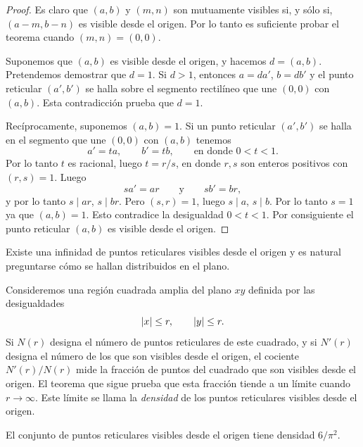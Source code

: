 \documentclass[12pt,a4paper]{book}
\begin{document}
    \begin{proof}
        Es claro que $(a,b)$ y $(m,n)$ son mutuamente visibles si, y sólo si,
        $(a-m,b-n)$ es visible desde el origen. Por lo tanto es suficiente probar el
        teorema cuando $(m,n)=(0,0)$.

        Suponemos que $(a,b)$ es visible desde el origen, y hacemos $d=(a,b)$. Pretendemos
        demostrar que $d=1$. Si $d>1$, entonces $a=da'$, $b=db'$ y el punto reticular
        $(a',b')$ se halla sobre el segmento rectilíneo que une $(0,0)$ con $(a,b)$. Esta
        contradicción prueba que $d=1$.

        Recíprocamente, suponemos $(a,b)=1$. Si un punto reticular $(a',b')$ se halla en el
        segmento que une $(0,0)$ con $(a,b)$ tenemos
        \begin{equation*}
            a'=ta,\qquad b'=tb,\qquad\text{en donde } 0<t<1.
        \end{equation*}
        Por lo tanto $t$ es racional, luego $t=r/s$, en donde $r,s$ son enteros positivos
        con $(r,s)=1$. Luego
        \begin{equation*}
            sa'=ar\qquad\text{y}\qquad sb'=br,
        \end{equation*}
        y por lo tanto $s\mid ar$, $s\mid br$. Pero $(s,r)=1$, luego $s\mid a$, $s\mid b$.
        Por lo tanto $s=1$ ya que $(a,b)=1$. Esto contradice la desigualdad $0<t<1$. Por
        consiguiente el punto reticular $(a,b)$ es visible desde el origen.
    \end{proof}

    Existe una infinidad de puntos reticulares visibles desde el origen y es natural
    preguntarse cómo se hallan distribuidos en el plano.

    Consideremos una región cuadrada amplia del plano $xy$ definida por las desigualdades
    \begin{equation*}
        \abs{x}\leq r,\qquad\abs{y}\leq r.
    \end{equation*}
    Si $N(r)$ designa el número de puntos reticulares de este cuadrado, y si $N'(r)$
    designa el número de los que son visibles desde el origen, el cociente $N'(r)/N(r)$
    mide la fracción de puntos del cuadrado que son visibles desde el origen. El teorema
    que sigue prueba que esta fracción tiende a un límite cuando $r\to\infty$. Este límite
    se llama la \textit{densidad} de los puntos reticulares visibles desde el origen.

    \begin{teorema}
        El conjunto de puntos reticulares visibles desde el origen tiene densidad
        $6/\pi^2$.
    \end{teorema}
\end{document}
